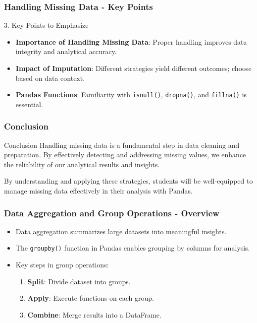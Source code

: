 \documentclass{beamer}
\begin{document}
\begin{frame}
    \frametitle{Handling Missing Data - Key Points}
    \begin{block}{3. Key Points to Emphasize}
        \begin{itemize}
            \item \textbf{Importance of Handling Missing Data}: Proper handling improves data integrity and analytical accuracy.
            \item \textbf{Impact of Imputation}: Different strategies yield different outcomes; choose based on data context.
            \item \textbf{Pandas Functions}: Familiarity with \texttt{isnull()}, \texttt{dropna()}, and \texttt{fillna()} is essential.
        \end{itemize}
    \end{block}
\end{frame}

\begin{frame}
    \frametitle{Conclusion}
    \begin{block}{Conclusion}
        Handling missing data is a fundamental step in data cleaning and preparation. 
        By effectively detecting and addressing missing values, we enhance the reliability of our analytical results and insights.

        By understanding and applying these strategies, students will be well-equipped to manage missing data effectively in their analysis with Pandas.
    \end{block}
\end{frame}

\begin{frame}[fragile]
    \frametitle{Data Aggregation and Group Operations - Overview}
    \begin{itemize}
        \item Data aggregation summarizes large datasets into meaningful insights.
        \item The \texttt{groupby()} function in Pandas enables grouping by columns for analysis.
        \item Key steps in group operations:
        \begin{enumerate}
            \item \textbf{Split}: Divide dataset into groups.
            \item \textbf{Apply}: Execute functions on each group.
            \item \textbf{Combine}: Merge results into a DataFrame.
        \end{enumerate}
    \end{itemize}
\end{frame}
\end{document}
